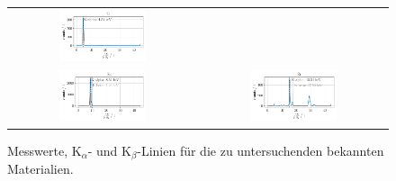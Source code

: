 \documentclass[ngerman]{scrartcl}
\begin{document}
\begin{figure}[H]
\begin{tabular}{cc}
        \includegraphics[width=0.48\textwidth]{../plots/roentgen_data_6.pdf}   \\
        \includegraphics[width=0.48\textwidth]{../plots/roentgen_data_7.pdf} &
        \includegraphics[width=0.48\textwidth]{../plots/roentgen_data_8.pdf}   \\
    \end{tabular}
    \caption[Messwerte bekannter Proben]{Messwerte, K$_{\alpha}$- und K$_{\beta}$-Linien für die zu untersuchenden bekannten Materialien.}
    \label{fig:roentgenfluoreszenz1}
\end{figure}
%
\end{document}

